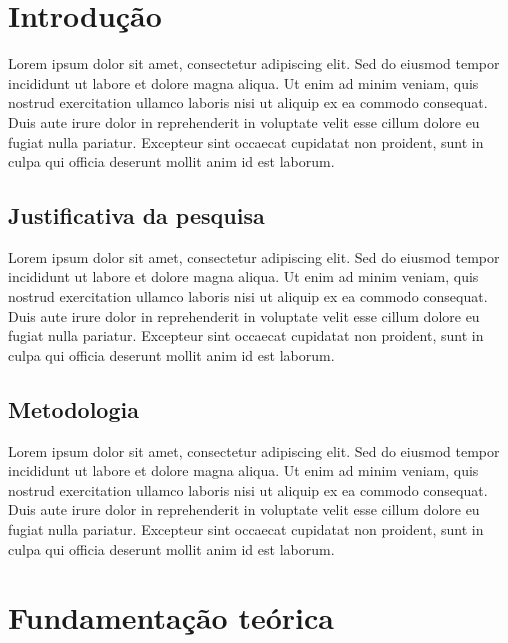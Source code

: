 \documentclass[
	12pt,				    %
	openright,			    %
	oneside,			    %
	a4paper,			    %
    sumario=tradicional,    %
	english,			    %
	brazilian,				    %
	]{abntex2}
\begin{document}
\textual


\chapter{Introdução}\label{sec:Introdução}

Lorem ipsum dolor sit amet, consectetur adipiscing elit. Sed do eiusmod tempor incididunt ut labore et dolore magna aliqua. Ut enim ad minim veniam, quis nostrud exercitation ullamco laboris nisi ut aliquip ex ea commodo consequat. Duis aute irure dolor in reprehenderit in voluptate velit esse cillum dolore eu fugiat nulla pariatur. Excepteur sint occaecat cupidatat non proident, sunt in culpa qui officia deserunt mollit anim id est laborum.

\section{Justificativa da pesquisa}\label{sec:Justificativa}

Lorem ipsum dolor sit amet, consectetur adipiscing elit. Sed do eiusmod tempor incididunt ut labore et dolore magna aliqua. Ut enim ad minim veniam, quis nostrud exercitation ullamco laboris nisi ut aliquip ex ea commodo consequat. Duis aute irure dolor in reprehenderit in voluptate velit esse cillum dolore eu fugiat nulla pariatur. Excepteur sint occaecat cupidatat non proident, sunt in culpa qui officia deserunt mollit anim id est laborum.

\section{Metodologia}\label{sec:Metodologia}

Lorem ipsum dolor sit amet, consectetur adipiscing elit. Sed do eiusmod tempor incididunt ut labore et dolore magna aliqua. Ut enim ad minim veniam, quis nostrud exercitation ullamco laboris nisi ut aliquip ex ea commodo consequat. Duis aute irure dolor in reprehenderit in voluptate velit esse cillum dolore eu fugiat nulla pariatur. Excepteur sint occaecat cupidatat non proident, sunt in culpa qui officia deserunt mollit anim id est laborum.

\chapter{Fundamentação teórica}\label{sec:FundTeórica}\thispagestyle{empty}
\end{document}
